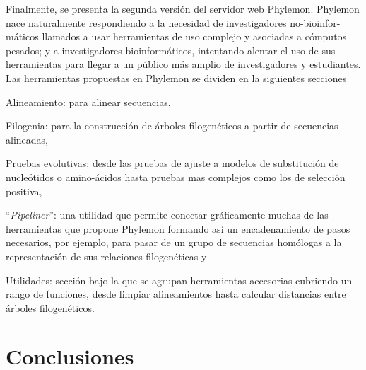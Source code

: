 Finalmente, se presenta la segunda versión del servidor web Phylemon. Phylemon nace naturalmente respondiendo a la necesidad de investigadores no-bioinfor-máticos llamados a usar herramientas de uso complejo y asociadas a cómputos pesados; y a investigadores bioinformáticos, intentando alentar el uso de sus herramientas para llegar a un público más amplio de investigadores y estudiantes. Las herramientas propuestas en Phylemon se dividen en la siguientes secciones
\begin{inparaenum}[\bgroup\bfseries\em 1\egroup\it)]
\item Alineamiento: para alinear secuencias,
\item Filogenia: para la construcción de árboles filogenéticos a partir de secuencias alineadas,
\item Pruebas evolutivas: desde las pruebas de ajuste a modelos de substitución de nucleótidos o amino-ácidos hasta pruebas mas complejos como los de selección positiva,
\item ``\textit{Pipeliner}'': una utilidad que permite conectar gráficamente muchas de las herramientas que propone Phylemon formando así un encadenamiento de pasos necesarios, por ejemplo, para pasar de un grupo de secuencias homólogas a la representación de sus relaciones filogenéticas y
\item Utilidades: sección bajo la que se agrupan herramientas accesorias cubriendo un rango de funciones, desde limpiar alineamientos hasta calcular distancias entre árboles filogenéticos.
\end{inparaenum}

\newpage
\section*{Conclusiones}

